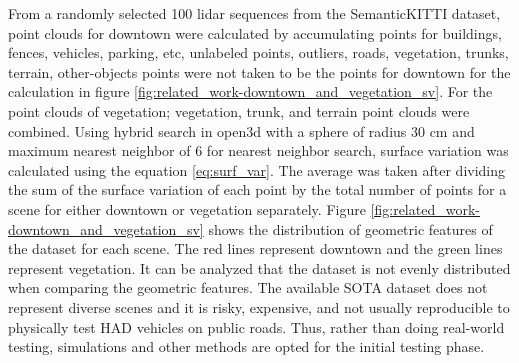 From a randomly selected 100 lidar sequences from the SemanticKITTI dataset, point clouds for downtown were calculated by accumulating points for buildings, fences, vehicles, parking, etc, unlabeled points, outliers, roads, vegetation, trunks, terrain, other-objects points were not taken to be the points for downtown for the calculation in figure \ref{fig:related_work-downtown_and_vegetation_sv}. For the point clouds of vegetation; vegetation, trunk, and terrain point clouds were combined. Using hybrid search in open3d \parencite{open3d} with a sphere of radius 30 cm and maximum nearest neighbor of 6 for nearest neighbor search, surface variation was calculated using the equation \ref{eq:surf_var}. The average was taken after dividing the sum of the surface variation of each point by the total number of points for a scene for either downtown or vegetation separately. Figure \ref{fig:related_work-downtown_and_vegetation_sv} shows the distribution of geometric features of the dataset for each scene. The red lines represent downtown and the green lines represent vegetation. It can be analyzed that the dataset is not evenly distributed when comparing the geometric features. The available SOTA dataset does not represent diverse scenes and it is risky, expensive, and not usually reproducible to physically test HAD vehicles on public roads. Thus, rather than doing real-world testing, simulations and other methods are opted for the initial testing phase.




